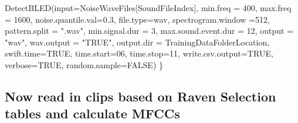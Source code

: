 \documentclass[
]{book}
\newenvironment{Shaded}{\begin{snugshade}}{\end{snugshade}}
\newcommand{\AttributeTok}[1]{\textcolor[rgb]{0.77,0.63,0.00}{#1}}
\newcommand{\ConstantTok}[1]{\textcolor[rgb]{0.00,0.00,0.00}{#1}}
\newcommand{\DecValTok}[1]{\textcolor[rgb]{0.00,0.00,0.81}{#1}}
\newcommand{\FloatTok}[1]{\textcolor[rgb]{0.00,0.00,0.81}{#1}}
\newcommand{\FunctionTok}[1]{\textcolor[rgb]{0.00,0.00,0.00}{#1}}
\newcommand{\NormalTok}[1]{#1}
\newcommand{\OtherTok}[1]{\textcolor[rgb]{0.56,0.35,0.01}{#1}}
\newcommand{\SpecialCharTok}[1]{\textcolor[rgb]{0.00,0.00,0.00}{#1}}
\newcommand{\StringTok}[1]{\textcolor[rgb]{0.31,0.60,0.02}{#1}}
\begin{document}
\begin{Shaded}
\begin{Highlighting}[]
  \FunctionTok{DetectBLED}\NormalTok{(}\AttributeTok{input=}\NormalTok{NoiseWaveFiles[SoundFileIndex],}
           \AttributeTok{min.freq =} \DecValTok{400}\NormalTok{, }
           \AttributeTok{max.freq =} \DecValTok{1600}\NormalTok{,}
           \AttributeTok{noise.quantile.val=}\FloatTok{0.3}\NormalTok{,}
           \AttributeTok{file.type=}\StringTok{\textquotesingle{}wav\textquotesingle{}}\NormalTok{,}
           \AttributeTok{spectrogram.window =}\DecValTok{512}\NormalTok{,}
           \AttributeTok{pattern.split =} \StringTok{".wav"}\NormalTok{, }
           \AttributeTok{min.signal.dur =} \DecValTok{3}\NormalTok{,}
           \AttributeTok{max.sound.event.dur =} \DecValTok{12}\NormalTok{, }
           \AttributeTok{output =} \StringTok{"wav"}\NormalTok{,}
           \AttributeTok{wav.output =} \StringTok{"TRUE"}\NormalTok{, }
           \AttributeTok{output.dir =}\NormalTok{ TrainingDataFolderLocation,}
           \AttributeTok{swift.time=}\ConstantTok{TRUE}\NormalTok{,}
           \AttributeTok{time.start=}\DecValTok{06}\NormalTok{,}
           \AttributeTok{time.stop=}\DecValTok{11}\NormalTok{,}
           \AttributeTok{write.csv.output=}\ConstantTok{TRUE}\NormalTok{,}
           \AttributeTok{verbose=}\ConstantTok{TRUE}\NormalTok{,}
           \AttributeTok{random.sample=}\ConstantTok{FALSE}\NormalTok{)}
\NormalTok{\}}
\end{Highlighting}
\end{Shaded}

\hypertarget{now-read-in-clips-based-on-raven-selection-tables-and-calculate-mfccs}{%
\subsection{Now read in clips based on Raven Selection tables and calculate MFCCs}\label{now-read-in-clips-based-on-raven-selection-tables-and-calculate-mfccs}}

\begin{Shaded}
\end{Shaded}
\end{document}
